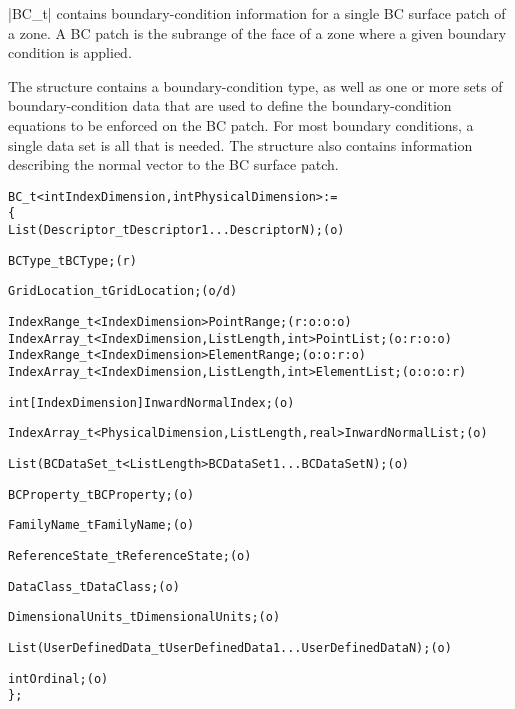 |BC_t| contains boundary-condition information for a single BC surface
patch of a zone.
A BC patch is the subrange of the face of a zone where a given boundary
condition is applied.

The structure contains a boundary-condition type, as well as one or
more sets of boundary-condition data that are used to define the
boundary-condition equations to be enforced on the BC patch.  For most
boundary conditions, a single data set is all that is needed.  The
structure also contains information describing the normal vector to the
BC surface patch.

\begin{alltt}
  BC\_t< int IndexDimension, int PhysicalDimension > :=
    \{
    List( Descriptor\_t Descriptor1 ... DescriptorN ) ;                      (o)

    BCType\_t BCType ;                                                       (r)

    GridLocation\_t GridLocation ;                                           (o/d)

    IndexRange\_t<IndexDimension> PointRange ;                               (r:o:o:o)
    IndexArray\_t<IndexDimension, ListLength, int> PointList ;               (o:r:o:o)
    IndexRange\_t<IndexDimension> ElementRange ;                             (o:o:r:o)
    IndexArray\_t<IndexDimension, ListLength, int> ElementList ;             (o:o:o:r)

    int[IndexDimension] InwardNormalIndex ;                                 (o)

    IndexArray\_t<PhysicalDimension, ListLength, real> InwardNormalList ;    (o)

    List( BCDataSet\_t<ListLength> BCDataSet1 ... BCDataSetN ) ;             (o)

    BCProperty\_t BCProperty ;                                               (o)

    FamilyName\_t FamilyName ;                                               (o)

    ReferenceState\_t ReferenceState ;                                       (o)

    DataClass\_t DataClass ;                                                 (o)
                
    DimensionalUnits\_t DimensionalUnits ;                                   (o)

    List( UserDefinedData\_t UserDefinedData1 ... UserDefinedDataN ) ;       (o)

    int Ordinal ;                                                           (o)
    \} ;
\end{alltt}

